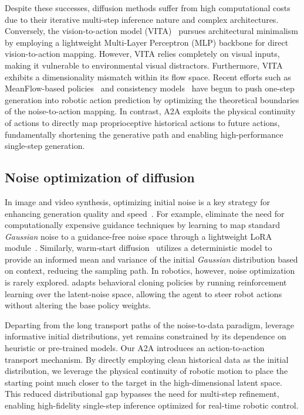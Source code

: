 \documentclass[onecolumn]{fairmeta}
\newcommand{\m}[1]{{A2A}}
\begin{document}
Despite these successes, diffusion methods suffer from high computational costs due to their iterative multi-step inference nature and complex architectures. Conversely, the vision-to-action model (VITA)~\citep{gao2025vita} pursues architectural minimalism by employing a lightweight Multi-Layer Perceptron (MLP) backbone for direct vision-to-action mapping. However, VITA relies completely on visual inputs, making it vulnerable to environmental visual distractors. Furthermore, VITA exhibits a dimensionality mismatch within its flow space. Recent efforts such as MeanFlow-based policies~\citep{fang2025omp, geng2025mean} and consistency models~\citep{zhang2025flowpolicy,li2026ofp, Consistency} have begun to push one-step generation into robotic action prediction by optimizing the theoretical boundaries of the noise-to-action mapping. In contrast, \m{} exploits the physical continuity of actions to directly map proprioceptive historical actions to future actions, fundamentally shortening the generative path and enabling high-performance single-step generation.

\subsection{Noise optimization of diffusion}

In image and video synthesis, optimizing initial noise is a key strategy for enhancing generation quality and speed~\citep{ahn2024noise,mao2024lottery,samuel2024generating,eyring2024reno, warmstarts}. For example, \citet{ahn2024noise} eliminate the need for computationally expensive guidance techniques by learning to map standard \textit{Gaussian} noise to a guidance-free noise space through a lightweight LoRA module~\citep{hu2022lora}. Similarly, warm-start diffusion~\citep{warmstarts} utilizes a deterministic model to provide an informed mean and variance of the initial \textit{Gaussian} distribution based on context, reducing the sampling path. In robotics, however, noise optimization is rarely explored. \citet{steeringdp} adapts behavioral cloning policies by running reinforcement learning over the latent-noise space, allowing the agent to steer robot actions without altering the base policy weights.

Departing from the long transport paths of the noise-to-data paradigm, \citet{chen2024bridger} leverage informative initial distributions, yet remains constrained by its dependence on heuristic or pre-trained models. Our \m{} introduces an action-to-action transport mechanism. By directly employing clean historical data as the initial distribution, we leverage the physical continuity of robotic motion to place the starting point much closer to the target in the high-dimensional latent space. This reduced distributional gap bypasses the need for multi-step refinement, enabling high-fidelity single-step inference optimized for real-time robotic control. 
	
\end{document}
